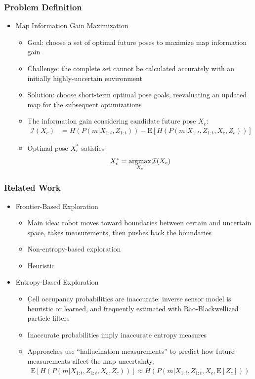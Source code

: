 \documentclass[11pt,professionalfonts,hyperref={pdftex,pdfpagemode=none,pdfstartview=FitH}]{beamer}
\newcommand{\argmax}{\operatornamewithlimits{argmax}}
\renewcommand{\emph}[1]{\textit{\textbf{\color{blue}{#1}}}}
\begin{document}
\begin{frame}
\frametitle{Problem Definition}
\begin{itemize}
        	\item Map Information Gain Maximization
	\begin{itemize}
		\item Goal: choose a set of optimal future poses to maximize map information gain
		\pause
		\item Challenge: the complete set cannot be calculated accurately with an initially highly-uncertain environment
		\pause
		\item Solution: choose short-term optimal pose goals, reevaluating an updated map for the subsequent optimizations
		\pause
		\item The information gain considering candidate future pose $X_c$:%
		\begin{align*}
			\mathcal I(X_c)&=H(P(m|X_{1:t},Z_{1:t}))-\text{E}\left[H(P(m|X_{1:t},Z_{1:t},X_c,Z_c))\right]
		\end{align*}
		\pause
		\item Optimal pose $X^*_c$ satisfies
		\begin{align*}
			X_c^*=\argmax_{X_c}{\mathcal I(X_c)}
		\end{align*}
	\end{itemize}
\end{itemize}


\end{frame}



\begin{frame}
\frametitle{Related Work}
\begin{itemize}
        	\item Frontier-Based Exploration
	\begin{itemize}
		\item Main idea: robot moves toward boundaries between certain and uncertain space, takes measurements, then pushes back the boundaries
		\item Non-entropy-based exploration
		\item Heuristic
	\end{itemize}
	\pause
	\item Entropy-Based Exploration
	\begin{itemize}
		\item Cell occupancy probabilities are inaccurate: inverse sensor model is heuristic or learned, and frequently estimated with Rao-Blackwellized particle filters
		\item Inaccurate probabilities imply inaccurate entropy measures
		\item Approaches use ``hallucination measurements'' to predict how future measurements \emph{might} affect the map uncertainty,
		\begin{align*}
			\text{E}\left[H(P(m|X_{1:t},Z_{1:t},X_c,Z_c))\right]\approx H(P(m|X_{1:t},Z_{1:t},X_c,\text{E}\left[Z_c\right]))
		\end{align*}
	\end{itemize}
\end{itemize}


\end{frame}
\end{document}
